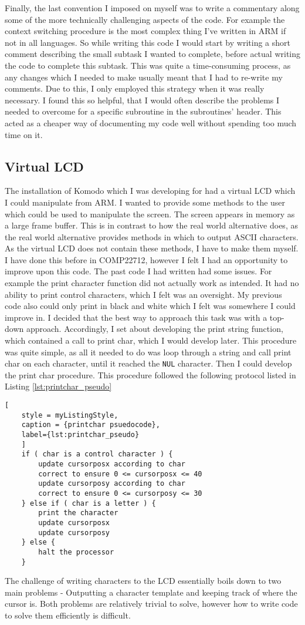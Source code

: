 Finally, the last convention I imposed on myself was to write a commentary along some of the more technically challenging aspects of the code. For example the context switching procedure is the most complex thing I've written in ARM if not in all languages. So while writing this code I would start by writing a short comment describing the small subtask I wanted to complete, before actual writing the code to complete this subtask. This was quite a time-consuming process, as any changes which I needed to make usually meant that I had to re-write my comments. Due to this, I only employed this strategy when it was really necessary. I found this so helpful, that I would often describe the problems I needed to overcome for a specific subroutine in the subroutines' header. This acted as a cheaper way of documenting my code well without spending too much time on it. 
\subsection{Virtual LCD}
The installation of Komodo which I was developing for had a virtual LCD which I could manipulate from ARM. I wanted to provide some methods to the user which could be used to manipulate the screen. The screen appears in memory as a large frame buffer. This is in contrast to how the real world alternative does, as the real world alternative provides methods in which to output ASCII characters. As the virtual LCD does not contain these methods, I have to make them myself. I have done this before in COMP22712, however I felt I had an opportunity to improve upon this code. The past code I had written had some issues. For example the print character function did not actually work as intended. It had no ability to print control characters, which I felt was an oversight. My previous code also could only print in black and white which I felt was somewhere I could improve in. I decided that the best way to approach this task was with a top-down approach. Accordingly, I set about developing the print string function, which contained a call to print char, which I would develop later. This procedure was quite simple, as all it needed to do was loop through a string and call print char on each character, until it reached the \verb|NUL| character. 
Then I could develop the print char procedure. This procedure followed the following protocol listed in Listing \ref{lst:printchar_pseudo}
\begin{lstlisting}[
	style = myListingStyle,
	caption = {printchar psuedocode},
	label={lst:printchar_pseudo}	
	]
	if ( char is a control character ) {	
		update cursorposx according to char
		correct to ensure 0 <= cursorposx <= 40
		update cursorposy according to char
		correct to ensure 0 <= cursorposy <= 30
	} else if ( char is a letter ) {
		print the character
		update cursorposx
		update cursorposy
	} else {
		halt the processor
	}
\end{lstlisting}
The challenge of writing characters to the LCD essentially boils down to two main problems - Outputting a character template and keeping track of where the cursor is. Both problems are relatively trivial to solve, however how to write code to solve them efficiently is difficult.
